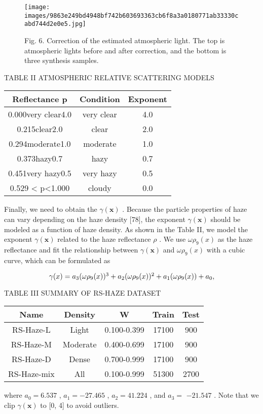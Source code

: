 \documentclass{article}
\begin{document}
\begin{figure}[htbp]
\centering
\texttt{[image: images/9863e249bd4948bf742b603693363cb6f8a3a0180771ab33330cabd744d2e0e5.jpg]}
\caption{Fig. 6. Correction of the estimated atmospheric light. The top is atmospheric lights before and after correction, and the bottom is three synthesis samples.}
\end{figure}


TABLE II ATMOSPHERIC RELATIVE SCATTERING MODELS


\begin{tabular}{|c|c|c|}\hline
Reflectance p & Condition & Exponent \\ \hline
0.000very clear4.0 & very clear & 4.0 \\ \hline
0.215clear2.0 & clear & 2.0 \\ \hline
0.294moderate1.0 & moderate & 1.0 \\ \hline
0.373hazy0.7 & hazy & 0.7 \\ \hline
0.451very hazy0.5 & very hazy & 0.5 \\ \hline
0.529 < p<1.000 & cloudy & 0.0 \\ \hline
\end{tabular}
Finally, we need to obtain the $\gamma(\boldsymbol{x})$ . Because the particle properties of haze can vary depending on the haze density [78], the exponent $\gamma(\boldsymbol{x})$ should be modeled as a function of haze density. As shown in the Table II, we model the exponent $\gamma(\boldsymbol{x})$ related to the haze reflectance $\rho$ . We use $\omega\rho_{9}(x)$ as the haze reflectance and fit the relationship between $\gamma(\boldsymbol{x})$ and $\omega\rho_{9}(x)$ with a cubic curve, which can be formulated as


\[
$$$$\gamma(x)=a_{3}(\omega\rho_{9}(x))^{3}+a_{2}(\omega\rho_{9}(x))^{2}+a_{1}(\omega\rho_{9}(x))+a_{0},
\]


TABLE III SUMMARY OF RS-HAZE DATASET


\begin{tabular}{|c|c|c|c|c|}\hline
Name & Density & W & Train & Test \\ \hline
RS-Haze-L & Light & 0.100-0.399 & 17100 & 900 \\ \hline
RS-Haze-M & Moderate & 0.400-0.699 & 17100 & 900 \\ \hline
RS-Haze-D & Dense & 0.700-0.999 & 17100 & 900 \\ \hline
RS-Haze-mix & All & 0.100-0.999 & 51300 & 2700 \\ \hline
\end{tabular}
where $a_{0}=6.537$ , $a_{1}=-27.465$ , $a_{2}=41.224$ , and $a_{3}=$ $-21.547$ . Note that we clip $\gamma(\boldsymbol{x})$ to [0, 4] to avoid outliers.
\end{document}
